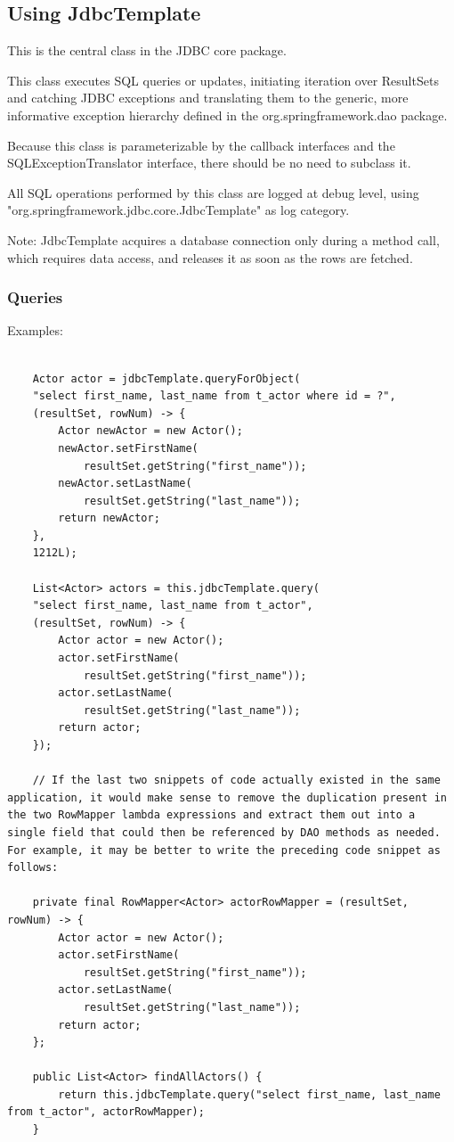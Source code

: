 \documentclass{scrartcl}
\begin{document}
\subsection{Using JdbcTemplate}

This is the central class in the JDBC core package.

This class executes SQL queries or updates, initiating iteration over ResultSets and catching JDBC exceptions and translating them to the generic, more informative exception hierarchy defined in the org.springframework.dao package.

Because this class is parameterizable by the callback interfaces and the SQLExceptionTranslator interface, there should be no need to subclass it.

All SQL operations performed by this class are logged at debug level, using "org.springframework.jdbc.core.JdbcTemplate" as log category.

Note: JdbcTemplate acquires a database connection only during a method call, which requires data access, and releases it as soon as the rows are fetched.

\subsubsection{Queries}

Examples:

\begin{lstlisting}

    Actor actor = jdbcTemplate.queryForObject(
    "select first_name, last_name from t_actor where id = ?",
    (resultSet, rowNum) -> {
        Actor newActor = new Actor();
        newActor.setFirstName(
            resultSet.getString("first_name"));
        newActor.setLastName(
            resultSet.getString("last_name"));
        return newActor;
    },
    1212L);

    List<Actor> actors = this.jdbcTemplate.query(
    "select first_name, last_name from t_actor",
    (resultSet, rowNum) -> {
        Actor actor = new Actor();
        actor.setFirstName(
            resultSet.getString("first_name"));
        actor.setLastName(
            resultSet.getString("last_name"));
        return actor;
    });

    // If the last two snippets of code actually existed in the same application, it would make sense to remove the duplication present in the two RowMapper lambda expressions and extract them out into a single field that could then be referenced by DAO methods as needed. For example, it may be better to write the preceding code snippet as follows:

    private final RowMapper<Actor> actorRowMapper = (resultSet, rowNum) -> {
        Actor actor = new Actor();
        actor.setFirstName(
            resultSet.getString("first_name"));
        actor.setLastName(
            resultSet.getString("last_name"));
        return actor;
    };

    public List<Actor> findAllActors() {
        return this.jdbcTemplate.query("select first_name, last_name from t_actor", actorRowMapper);
    }
\end{lstlisting}
\end{document}
